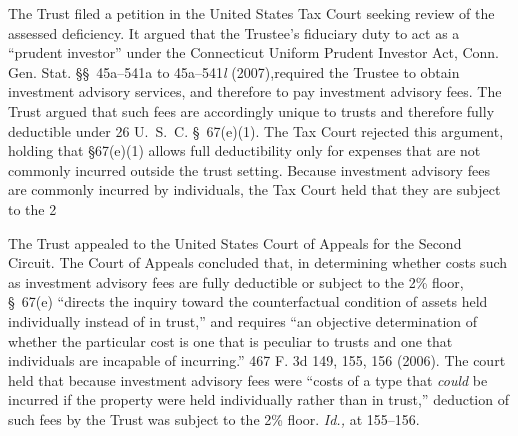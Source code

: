   The Trust filed a petition in the United States Tax Court seeking review of the assessed deficiency. It argued that the Trustee's fiduciary duty to act as a ``prudent investor'' \newpage  under the Connecticut Uniform Prudent Investor Act, Conn. Gen. Stat. \S\S~45a--541a to 45a--541\emph{l} (2007),\footnotemark[2] required the Trustee to obtain investment advisory services, and therefore to pay investment advisory fees. The Trust argued that such fees are accordingly unique to trusts and therefore fully deductible under 26 U.~S.~C. \S~67(e)(1). The Tax Court rejected this argument, holding that \S67(e)(1) allows full deductibility only for expenses that are not commonly incurred outside the trust setting. Because investment advisory fees are commonly incurred by individuals, the Tax Court held that they are subject to the 2%


  The Trust appealed to the United States Court of Appeals for the Second Circuit. The Court of Appeals concluded that, in determining whether costs such as investment advisory fees are fully deductible or subject to the 2\% floor, \S~67(e) ``directs the inquiry toward the counterfactual condition of assets held individually instead of in trust,'' and requires ``an objective determination of whether the particular cost is one that is peculiar to trusts and one that individuals are incapable of incurring.'' 467 F. 3d 149, 155, 156 (2006). The court held that because investment advisory fees were ``costs of a type that \emph{could} be incurred if the property were held individually rather than in trust,'' deduction of such fees by the Trust was subject to the 2\% floor. \emph{Id.,} at 155--156.\newpage


